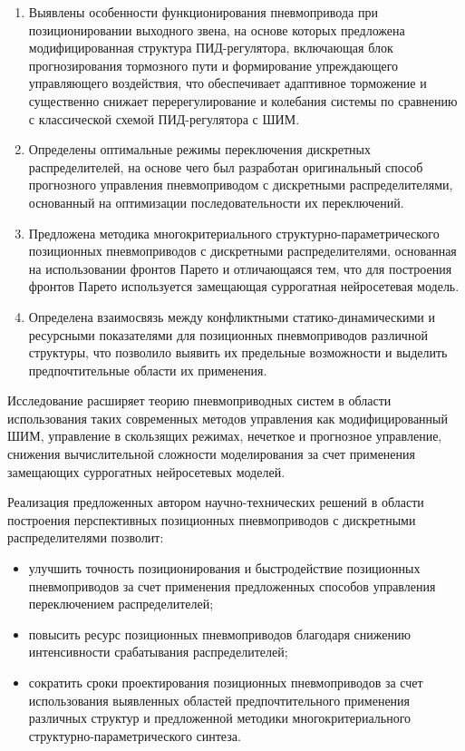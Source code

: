 {\novelty}
\begin{enumerate}[beginpenalty=10000] %

	\item Выявлены особенности функционирования пневмопривода при позиционировании выходного звена,
	      на основе которых предложена модифицированная структура ПИД-регулятора, включающая блок прогнозирования
	      тормозного пути и формирование упреждающего управляющего воздействия, что обеспечивает адаптивное торможение
	      и существенно снижает перерегулирование и колебания системы по сравнению с классической схемой ПИД-регулятора с ШИМ.

	\item Определены оптимальные режимы переключения дискретных распределителей, на основе
	      чего был разработан оригинальный способ прогнозного управления пневмоприводом с дискретными
	      распределителями, основанный на оптимизации последовательности их переключений.

	\item Предложена методика многокритериального структурно-\allowbreak па\-ра\-ме\-три\-че\-ско\-го
	      позиционных пневмоприводов с дискретными распределителями, основанная на использовании
	      фронтов Парето и отличающаяся тем, что для построения фронтов Парето используется
	      замещающая суррогатная нейросетевая модель.

	\item Определена взаимосвязь между конфликтными статико-динамическими и ресурсными
	      показателями для позиционных пневмоприводов различной структуры, что позволило выявить
	      их предельные возможности и выделить предпочтительные области их применения.
\end{enumerate}

{\influenceTheoretical}
Исследование расширяет теорию пневмоприводных систем в области использования
таких современных методов управления как модифицированный ШИМ, управление
в скользящих режимах, нечеткое и прогнозное управление, снижения вычислительной
сложности моделирования за счет применения замещающих суррогатных нейросетевых моделей.

{\influencePractical}
Реализация предложенных автором научно-технических решений в области построения
перспективных позиционных пневмоприводов с дискретными распределителями позволит:

\begin{itemize}
	\item улучшить точность позиционирования и быстродействие позиционных пневмоприводов
	      за счет применения предложенных способов управления переключением распределителей;

	\item повысить ресурс позиционных пневмоприводов благодаря
	      снижению интенсивности срабатывания распределителей;

	\item сократить сроки проектирования позиционных пневмоприводов за счет использования
	      выявленных областей предпочтительного применения различных структур и
	      предложенной методики многокритериального структурно-параметрического синтеза.
\end{itemize}

